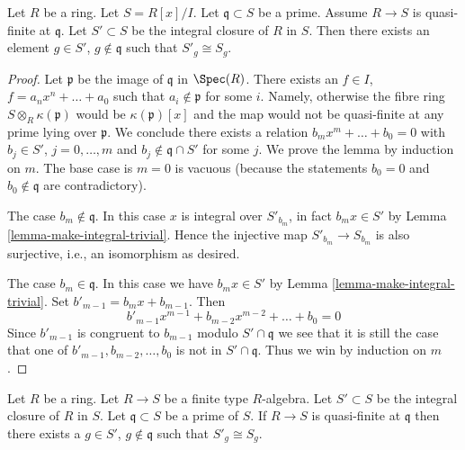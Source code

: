 \begin{lemma}
\label{lemma-quasi-finite-monogenic}
Let $R$ be a ring. Let $S = R[x]/I$.
Let $\mathfrak q \subset S$ be a prime.
Assume $R \to S$ is quasi-finite at $\mathfrak q$.
Let $S' \subset S$ be the integral closure of $R$ in $S$.
Then there exists an element
$g \in S'$, $g \not\in \mathfrak q$ such that
$S'_g \cong S_g$.
\end{lemma}

\begin{proof}
Let $\mathfrak p$ be the image of $\mathfrak q$ in $\Spec(R)$.
There exists an $f \in I$, $f = a_nx^n + \ldots + a_0$ such that
$a_i \not \in \mathfrak p$ for some $i$. Namely, otherwise the fibre ring
$S \otimes_R \kappa(\mathfrak p)$ would be $\kappa(\mathfrak p)[x]$
and the map would not be quasi-finite at any prime lying
over $\mathfrak p$. We conclude there exists a relation
$b_m x^m + \ldots + b_0 = 0$ with $b_j \in S'$, $j = 0, \ldots, m$
and $b_j \not \in \mathfrak q \cap S'$ for some $j$.
We prove the lemma by induction on $m$. The base case is
$m = 0$ is vacuous (because the statements $b_0 = 0$ and
$b_0 \not \in \mathfrak q$ are contradictory).

\medskip\noindent
The case $b_m \not \in \mathfrak q$. In this case $x$ is integral
over $S'_{b_m}$, in fact $b_mx \in S'$ by
Lemma \ref{lemma-make-integral-trivial}.
Hence the injective map $S'_{b_m} \to S_{b_m}$ is also surjective, i.e.,
an isomorphism as desired.

\medskip\noindent
The case $b_m \in \mathfrak q$. In this case we have $b_mx \in S'$ by
Lemma \ref{lemma-make-integral-trivial}.
Set $b'_{m - 1} = b_mx + b_{m - 1}$. Then
$$
b'_{m - 1}x^{m - 1} + b_{m - 2}x^{m - 2} + \ldots + b_0 = 0
$$
Since $b'_{m - 1}$ is congruent to $b_{m - 1}$ modulo $S' \cap \mathfrak q$
we see that it is still the case that one of
$b'_{m - 1}, b_{m - 2}, \ldots, b_0$ is not in $S' \cap \mathfrak q$.
Thus we win by induction on $m$.
\end{proof}

\begin{theorem}
\label{theorem-main-theorem}
Let $R$ be a ring. Let $R \to S$ be a finite type $R$-algebra.
Let $S' \subset S$ be the integral closure of $R$ in $S$.
Let $\mathfrak q \subset S$ be a prime of $S$.
If $R \to S$ is quasi-finite at $\mathfrak q$ then
there exists a $g \in S'$, $g \not \in \mathfrak q$
such that $S'_g \cong S_g$.
\end{theorem}

